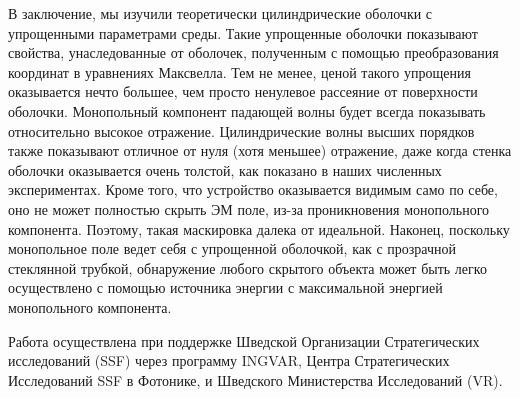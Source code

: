 \documentclass[12pt]{article}
\begin{document}
В заключение, мы изучили теоретически цилиндрические оболочки с
упрощенными параметрами среды. Такие упрощенные оболочки показывают
свойства, унаследованные от оболочек, полученным с помощью
преобразования координат в уравнениях Максвелла. Тем не менее, ценой
такого упрощения оказывается нечто большее, чем просто ненулевое
рассеяние от поверхности оболочки. Монопольный компонент падающей
волны будет всегда показывать относительно высокое отражение.
Цилиндрические волны высших порядков также показывают отличное от нуля
(хотя меньшее) отражение, даже когда стенка оболочки оказывается очень
толстой, как показано в наших численных экспериментах. Кроме того, что
устройство оказывается видимым само по себе, оно не может полностью
скрыть ЭМ поле, из-за проникновения монопольного компонента. Поэтому,
такая маскировка далека от идеальной. Наконец, поскольку монопольное
поле ведет себя с упрощенной оболочкой, как с прозрачной стеклянной
трубкой, обнаружение любого скрытого объекта может быть легко
осуществлено с помощью источника энергии с максимальной энергией
монопольного компонента.

Работа осуществлена при поддержке Шведской Организации Стратегических
исследований (SSF) через программу INGVAR, Центра Стратегических
Исследований SSF в Фотонике, и Шведского Министерства Исследований
(VR).
\end{document}
